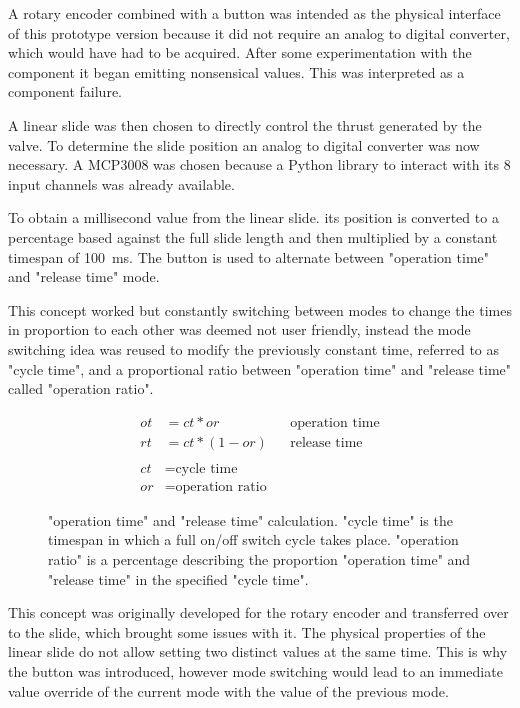 A rotary encoder combined with a button was intended as the physical interface of this prototype version because it did not require an analog to digital converter, which would have had to be acquired. After some experimentation with the component it began emitting nonsensical values. This was interpreted as a component failure. 

A linear slide was then chosen to directly control the thrust generated by the valve. To determine the slide position an analog to digital converter was now necessary. A MCP3008 was chosen because a Python library \cite{mcp3008-library} to interact with its 8 input channels was already available. 

To obtain a millisecond value from the linear slide. its position is converted to a percentage based against the full slide length and then multiplied by a constant timespan of \SI{100}{\milli\second}. The button is used to alternate between "operation time" and "release time" mode. 

This concept worked but constantly switching between modes to change the times in proportion to each other was deemed not user friendly, instead the mode switching idea was reused to modify the previously constant time, referred to as "cycle time", and a proportional ratio between "operation time" and "release time" called "operation ratio".

\begin{figure}[H]
\begin{align*}
    ot &=ct * or && \text{operation time} \\
    rt &=ct * (1 - or) && \text{release time} \\ \\
    ct &= \text{cycle time} \\
    or &= \text{operation ratio}
\end{align*}
\caption{"operation time" and "release time" calculation. "cycle time" is the timespan in which a full on/off switch cycle takes place. "operation ratio" is a percentage describing the proportion "operation time" and "release time" in the specified "cycle time".}
\end{figure}

This concept was originally developed for the rotary encoder and transferred over to the slide, which brought some issues with it. The physical properties of the linear slide do not allow setting two distinct values at the same time. This is why the button was introduced, however mode switching would lead to an immediate value override of the current mode with the value of the previous mode.

